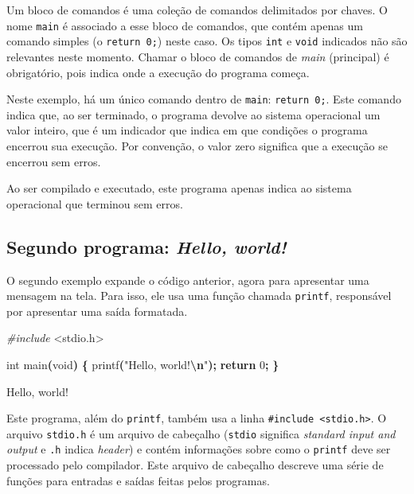 \documentclass[
  11pt,
  a4paper,
]{scrbook}
\newenvironment{Shaded}{\begin{snugshade}}{\end{snugshade}}
\newcommand{\ControlFlowTok}[1]{\textcolor[rgb]{0.13,0.29,0.53}{\textbf{#1}}}
\newcommand{\DataTypeTok}[1]{\textcolor[rgb]{0.13,0.29,0.53}{#1}}
\newcommand{\DecValTok}[1]{\textcolor[rgb]{0.00,0.00,0.81}{#1}}
\newcommand{\ImportTok}[1]{#1}
\newcommand{\NormalTok}[1]{#1}
\newcommand{\OperatorTok}[1]{\textcolor[rgb]{0.81,0.36,0.00}{\textbf{#1}}}
\newcommand{\PreprocessorTok}[1]{\textcolor[rgb]{0.56,0.35,0.01}{\textit{#1}}}
\newcommand{\SpecialCharTok}[1]{\textcolor[rgb]{0.81,0.36,0.00}{\textbf{#1}}}
\newcommand{\StringTok}[1]{\textcolor[rgb]{0.31,0.60,0.02}{#1}}
\begin{document}
Um bloco de comandos é uma coleção de comandos delimitados por chaves. O
nome \texttt{main} é associado a esse bloco de comandos, que contém
apenas um comando simples (o \texttt{return\ 0;}) neste caso. Os tipos
\texttt{int} e \texttt{void} indicados não são relevantes neste momento.
Chamar o bloco de comandos de \emph{main} (principal) é obrigatório,
pois indica onde a execução do programa começa.

Neste exemplo, há um único comando dentro de \texttt{main}:
\texttt{return\ 0;}. Este comando indica que, ao ser terminado, o
programa devolve ao sistema operacional um valor inteiro, que é um
indicador que indica em que condições o programa encerrou sua execução.
Por convenção, o valor zero significa que a execução se encerrou sem
erros.

Ao ser compilado e executado, este programa apenas indica ao sistema
operacional que terminou sem erros.

\subsection{\texorpdfstring{Segundo programa: \emph{Hello,
world!}}{Segundo programa: Hello, world!}}\label{segundo-programa-hello-world}

O segundo exemplo expande o código anterior, agora para apresentar uma
mensagem na tela. Para isso, ele usa uma função chamada \texttt{printf},
responsável por apresentar uma saída formatada.

\begin{Shaded}
\begin{Highlighting}[]
\PreprocessorTok{\#include }\ImportTok{\textless{}stdio.h\textgreater{}}

\DataTypeTok{int}\NormalTok{ main}\OperatorTok{(}\DataTypeTok{void}\OperatorTok{)} \OperatorTok{\{}
\NormalTok{    printf}\OperatorTok{(}\StringTok{"Hello, world!}\SpecialCharTok{\textbackslash{}n}\StringTok{"}\OperatorTok{);}
    \ControlFlowTok{return} \DecValTok{0}\OperatorTok{;}
\OperatorTok{\}}
\end{Highlighting}
\end{Shaded}

\begin{Shaded}
\begin{Highlighting}[]
\NormalTok{Hello, world!}
\end{Highlighting}
\end{Shaded}

Este programa, além do \texttt{printf}, também usa a linha
\texttt{\#include\ \textless{}stdio.h\textgreater{}}. O arquivo
\texttt{stdio.h} é um arquivo de cabeçalho (\texttt{stdio} significa
\emph{standard input and output} e \texttt{.h} indica \emph{header}) e
contém informações sobre como o \texttt{printf} deve ser processado pelo
compilador. Este arquivo de cabeçalho descreve uma série de funções para
entradas e saídas feitas pelos programas.
\end{document}
